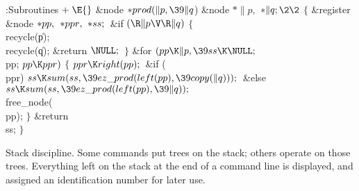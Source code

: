 \Y\B\4:Subroutines\X${}\mathrel+\E{}$\6
\&{node} ${}{*}\\{prod}(\|p,\39\|q{}$)\1\1\6
\&{node} ${}{*}\|p,{}$ ${}{*}\|q;\2\2{}$\6
${}\{{}$\1\6
\&{register} \&{node} ${}{*}\\{pp},{}$ ${}{*}\\{ppr},{}$ ${}{*}\\{ss};{}$\7
\&{if} ${}(\R\|p\V\R\|q){}$\5
${}\{{}$\1\6
\\{recycle}(\|p);\6
\\{recycle}(\|q);\6
\&{return} ${}\NULL;{}$\6
\4${}\}{}$\2\6
\&{for} ${}(\\{pp}\K\|p,\39\\{ss}\K\NULL;{}$ \\{pp}; ${}\\{pp}\K\\{ppr}){}$\5
${}\{{}$\1\6
${}\\{ppr}\K\\{right}(\\{pp});{}$\6
\&{if} (\\{ppr})\1\5
${}\\{ss}\K\\{sum}(\\{ss},\39\\{ez\_prod}(\\{left}(\\{pp}),\39\\{copy}(%
\|q)));{}$\2\6
\&{else}\1\5
${}\\{ss}\K\\{sum}(\\{ss},\39\\{ez\_prod}(\\{left}(\\{pp}),\39\|q));{}$\2\6
\\{free\_node}(\\{pp});\6
\4${}\}{}$\2\6
\&{return} \\{ss};\6
\4${}\}{}$\2\par
\fi

Stack discipline. Some commands put trees on the stack;
others operate
on those trees. Everything left on the stack at the end of a command line
is displayed, and assigned an identification number for later use.

